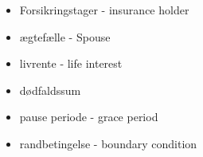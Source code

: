 \begin{itemize}
	\item Forsikringstager - insurance holder
	\item ægtefælle - Spouse
	\item livrente - life interest
	\item dødfaldssum
	\item pause periode - grace period
	\item randbetingelse - boundary condition
\end{itemize}